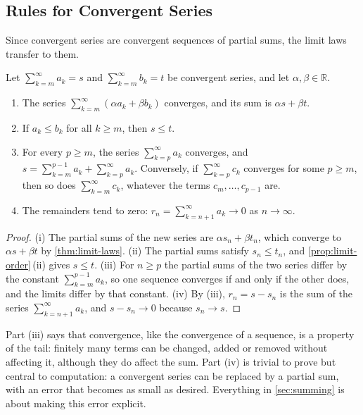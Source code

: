\subsection{Rules for Convergent Series}

Since convergent series are convergent sequences of partial sums, the limit laws transfer to them.

\begin{theorem}
\label{thm:series-rules}
Let $\sum_{k=m}^\infty a_k=s$ and $\sum_{k=m}^\infty b_k=t$ be convergent series, and let $\alpha,\beta\in\mathbb R$.
\begin{enumerate}
\item The series $\sum_{k=m}^\infty(\alpha a_k+\beta b_k)$ converges, and its sum is $\alpha s+\beta t$.
\item If $a_k\le b_k$ for all $k\ge m$, then $s\le t$.
\item For every $p\ge m$, the series $\sum_{k=p}^\infty a_k$ converges, and $s=\sum_{k=m}^{p-1}a_k+\sum_{k=p}^\infty a_k$. Conversely, if $\sum_{k=p}^\infty c_k$ converges for some $p\ge m$, then so does $\sum_{k=m}^\infty c_k$, whatever the terms $c_m,\ldots,c_{p-1}$ are.
\item The remainders tend to zero: $r_n=\sum_{k=n+1}^\infty a_k\to0$ as $n\to\infty$.
\end{enumerate}
\end{theorem}

\begin{proof}
(i) The partial sums of the new series are $\alpha s_n+\beta t_n$, which converge to $\alpha s+\beta t$ by \cref{thm:limit-laws}. (ii) The partial sums satisfy $s_n\le t_n$, and \cref{prop:limit-order}\,(ii) gives $s\le t$. (iii) For $n\ge p$ the partial sums of the two series differ by the constant $\sum_{k=m}^{p-1}a_k$, so one sequence converges if and only if the other does, and the limits differ by that constant. (iv) By (iii), $r_n=s-s_n$ is the sum of the series $\sum_{k=n+1}^\infty a_k$, and $s-s_n\to0$ because $s_n\to s$.
\end{proof}

Part (iii) says that convergence, like the convergence of a sequence, is a property of the tail: finitely many terms can be changed, added or removed without affecting it, although they do affect the sum. Part (iv) is trivial to prove but central to computation: a convergent series can be replaced by a partial sum, with an error that becomes as small as desired. Everything in \cref{sec:summing} is about making this error explicit.

